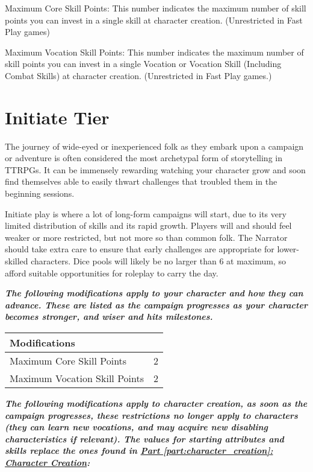 \begin{displayquote}
    Maximum Core Skill Points: This number indicates the maximum number of skill points you can invest in a single skill at character creation. (Unrestricted in Fast Play games)

    Maximum Vocation Skill Points: This number indicates the maximum number of skill points you can invest in a single Vocation or Vocation Skill (Including Combat Skills) at character creation. (Unrestricted in Fast Play games.)
\end{displayquote}

\section{Initiate Tier}

The journey of wide-eyed or inexperienced folk as they embark upon a campaign or adventure is often considered the most archetypal form of storytelling in TTRPGs. It can be immensely rewarding watching your character grow and soon find themselves able to easily thwart challenges that troubled them in the beginning sessions.

Initiate play is where a lot of long-form campaigns will start, due to its very limited distribution of skills and its rapid growth. Players will and should feel weaker or more restricted, but not more so than common folk. The Narrator should take extra care to ensure that early challenges are appropriate for lower-skilled characters. Dice pools will likely be no larger than 6 at maximum, so afford suitable opportunities for roleplay to carry the day.

\textbf{\textit{The following modifications apply to your character and how they can advance. These are listed as the campaign progresses as your character becomes stronger, and wiser and hits milestones.}}

\begin{center}
    \begin{xltabular}{\textwidth}{|l c|} 
        \hline 
        \textbf{Modifications} &  \\
        \hline
        Maximum Core Skill Points & 2 \\
        Maximum Vocation Skill Points & 2 \\ 
        \hline
    \end{xltabular}
\end{center}

\textbf{\textit{The following modifications apply to character creation, as soon as the campaign progresses, these restrictions no longer apply to characters (they can learn new vocations, and may acquire new disabling characteristics if relevant). The values for starting attributes and skills replace the ones found in \hyperref[part:character_creation]{Part \ref{part:character_creation}: Character Creation}:}}

